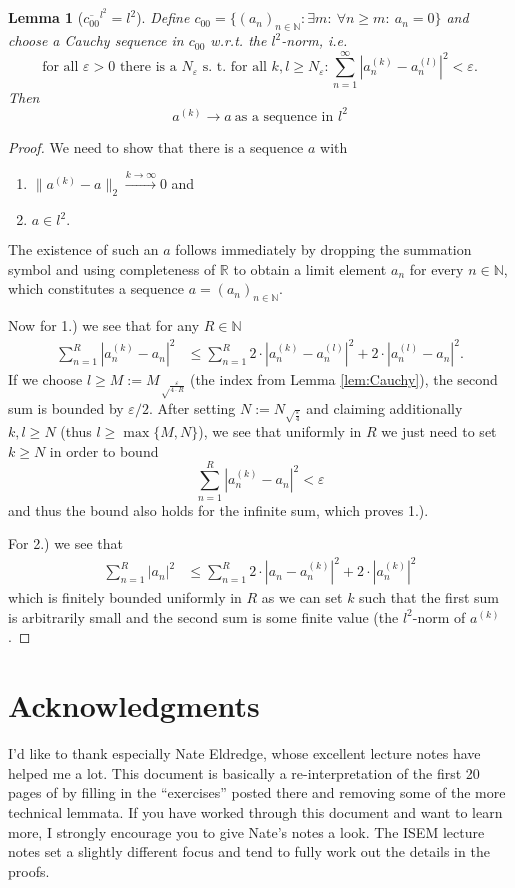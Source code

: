 \documentclass{scrartcl}
\newtheorem{lemma}{Lemma}
\theoremstyle{definition}
\theoremstyle{remark}
\newcommand{\eps}{\varepsilon}
\newcommand{\N}{\mathbb N}
\newcommand{\R}{\mathbb R}
\begin{document}
\begin{lemma}[$\overline{c_{00}}^{l^2} = l^2$]\label{lem:c00l2}
Define $c_{00} = \{(a_n)_{n\in\N}: \exists m:~ \forall n\geq m:~ a_n = 0\}$ and choose a Cauchy sequence in $c_{00}$ w.r.t. the $l^2$-norm, i.e.
\[\text{for all } \eps > 0 \text{ there is a } N_\eps \text{ s. t. for all } k,l\geq N_\eps: \sum_{n=1}^\infty |a_n^{(k)} - a_n^{(l)}|^2 < \eps.\]
Then \[a^{(k)} \to a ~ \text{as a sequence in $l^2$}\]
\end{lemma}
\begin{proof}
We need to show that there is a sequence $a$ with
\begin{enumerate}
\item $\|a^{(k)} - a\|_2 \xrightarrow{k\to\infty} 0$ and
\item $a \in l^2.$
\end{enumerate}
The existence of such an $a$ follows immediately by dropping the summation symbol and using completeness of $\R$ to obtain a limit element $a_n$ for every $n\in \N$, which constitutes a sequence $a = (a_n)_{n\in\N}$.

Now for 1.) we see that for any $R\in\N$
\begin{align*}
\sum_{n=1}^R |a_n^{(k)}-a_n|^2 &\leq  \sum_{n=1}^R 2\cdot |a_n^{(k)}-a_n^{(l)}|^2 + 2\cdot |a_n^{(l)}-a_n|^2.
\end{align*}
If we choose $l \geq M := M_{\sqrt\frac{\eps}{4\cdot R}}$ (the index from Lemma \ref{lem:Cauchy}), the second sum is bounded by $\eps/2$. After setting $N := N_{\sqrt{\frac{\eps}{4}}}$ and claiming additionally $k,l\geq N$ (thus $l\geq\max\{M,N\}$), we see that uniformly in $R$ we just need to set $k \geq N$ in order to bound 
\[\sum_{n=1}^R |a_n^{(k)}-a_n|^2  < \eps \]
and thus the bound also holds for the infinite sum, which proves 1.).

For 2.) we see that 
\begin{align*}
\sum_{n=1}^R |a_n|^2 &\leq \sum_{n=1}^R 2 \cdot|a_n-a_n^{(k)}|^2 + 2\cdot | a_n^{(k)}|^2
\end{align*}
which is finitely bounded uniformly in $R$ as we can set $k$ such that the first sum is arbitrarily small and the second sum is some finite value (the $l^2$-norm of $a^{(k)}$.
\end{proof}
\section{Acknowledgments}
I'd like to thank especially Nate Eldredge, whose excellent lecture notes have helped me a lot. This document is basically a re-interpretation of the first 20 pages of \cite{eldredge2016analysis} by filling in the ``exercises'' posted there and removing some of the more technical lemmata. If you have worked through this document and want to learn more, I strongly encourage you to give Nate's notes a look. The ISEM lecture notes \cite{Lunardi} set a slightly different focus and tend to fully work out the details in the proofs.
\end{document}
